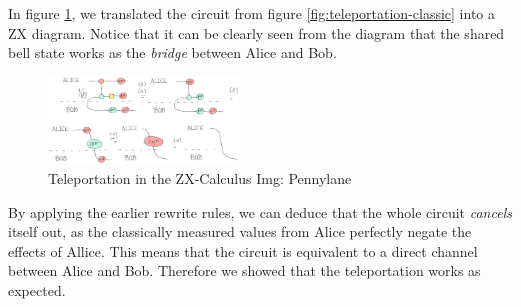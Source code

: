 In figure \ref{fig:teleportation}, we translated the circuit from figure \ref{fig:teleportation-classic} into a ZX diagram. Notice that it can be clearly seen from the diagram that the shared bell state works as the \textit{bridge} between Alice and Bob.

\begin{figure}[h]
    \centering
    \includegraphics[width=0.45\textwidth]{images/teleportation.png}
    \caption{Teleportation in the ZX-Calculus Img: Pennylane\cite{pennylane2023zx}}
    \label{fig:teleportation}
\end{figure}

By applying the earlier rewrite rules, we can deduce that the whole circuit \textit{cancels} itself out, as the classically measured values from Alice perfectly negate the effects of Allice. This means that the circuit is equivalent to a direct channel between Alice and Bob. Therefore we showed that the teleportation works as expected.